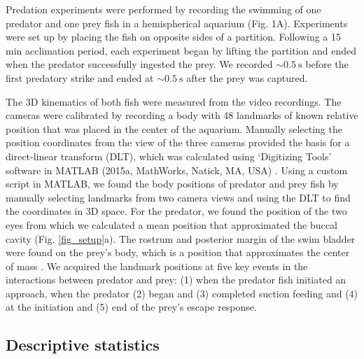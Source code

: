 \documentclass[]{rsos}%
\begin{document}
Predation experiments were performed by recording the swimming of one predator and one prey fish in a hemispherical aquarium (Fig. 1A). 
Experiments were set up by placing the fish on opposite sides of a partition.
Following a 15 min acclimation period, each experiment began by lifting the partition and ended when the predator successfully ingested the prey.
We recorded $\sim \SI{0.5}{\s}$ before the first predatory strike and ended at $\sim \SI{0.5}{\s}$  after the prey was captured.

The 3D kinematics of both fish were measured from the video recordings. 
The cameras were calibrated by recording a body with 48 landmarks of known relative position that was placed in the center of the aquarium.
Manually selecting the position coordinates from the view of the three cameras provided the basis for a direct-linear transform (DLT), which was calculated using  `Digitizing Tools' software in MATLAB (2015a, MathWorks, Natick, MA, USA) \cite{Hedrick:2008wz}.
Using a custom script in MATLAB, we found the body positions of predator and prey fish by manually selecting landmarks from two camera views and using the DLT to find the coordinates in 3D space.
For the predator, we found the position of the two eyes from which we calculated a mean position that approximated the buccal cavity (Fig. \ref{fig_setup}a).
The rostrum and posterior margin of the swim bladder were found on the prey's body, which is a position that approximates the center of mass \cite{Stewart:2010ig}.
We acquired the landmark positions at five key events in the interactions between predator and prey: (1) when the predator fish initiated an approach, when the predator (2) began and (3) completed suction feeding and (4) at the initiation and (5) end of the prey's escape response.


\subsection{Descriptive statistics}
\end{document}
